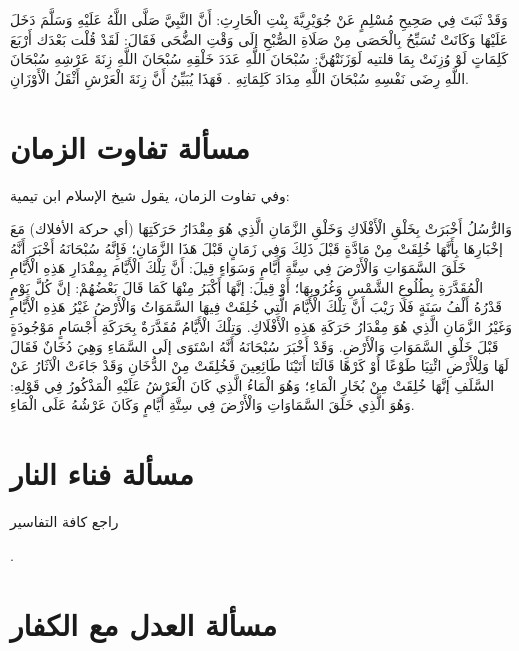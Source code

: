 وَقَدْ ثَبَتَ فِي صَحِيحِ مُسْلِمٍ {عَنْ جُوَيْرِيَّةَ بِنْتِ الْحَارِثِ: أَنَّ النَّبِيَّ صَلَّى اللَّهُ عَلَيْهِ وَسَلَّمَ دَخَلَ عَلَيْهَا وَكَانَتْ تُسَبِّحُ بِالْحَصَى مِنْ صَلَاةِ الصُّبْحِ إلَى وَقْتِ الضُّحَى فَقَالَ: لَقَدْ قُلْت بَعْدَك أَرْبَعَ كَلِمَاتٍ لَوْ وُزِنَتْ بِمَا قلتيه لَوَزَنَتْهُنَّ: سُبْحَانَ اللَّهِ عَدَدَ خَلْقِهِ سُبْحَانَ اللَّهِ زِنَةَ عَرْشِهِ سُبْحَانَ اللَّهِ رِضَى نَفْسِهِ سُبْحَانَ اللَّهِ مِدَادَ كَلِمَاتِهِ} . فَهَذَا يُبَيِّنُ أَنَّ زِنَةَ الْعَرْشِ أَثْقَلُ الْأَوْزَانِ.

\section{مسألة تفاوت الزمان}


وفي تفاوت الزمان، يقول شيخ الإسلام ابن تيمية:

وَالرُّسُلُ أَخْبَرَتْ بِخَلْقِ الْأَفْلَاكِ وَخَلْقِ الزَّمَانِ الَّذِي هُوَ مِقْدَارُ حَرَكَتِهَا (أي حركة الأفلاك) مَعَ إخْبَارِهَا بِأَنَّهَا خُلِقَتْ مِنْ مَادَّةٍ قَبْلَ ذَلِكَ وَفِي زَمَانٍ قَبْلَ هَذَا الزَّمَانِ؛ فَإِنَّهُ سُبْحَانَهُ أَخْبَرَ أَنَّهُ خَلَقَ السَّمَوَاتِ وَالْأَرْضَ فِي سِتَّةِ أَيَّامٍ وَسَوَاءٍ قِيلَ: أَنَّ تِلْكَ الْأَيَّامَ بِمِقْدَارِ هَذِهِ الْأَيَّامِ الْمُقَدَّرَةِ بِطُلُوعِ الشَّمْسِ وَغُرُوبِهَا؛ أَوْ قِيلَ: إنَّهَا أَكْبَرُ مِنْهَا كَمَا قَالَ بَعْضُهُمْ: إنَّ كُلَّ يَوْمٍ قَدْرُهُ أَلْفُ سَنَةٍ فَلَا رَيْبَ أَنَّ تِلْكَ الْأَيَّامَ الَّتِي خُلِقَتْ فِيهَا السَّمَوَاتُ وَالْأَرْضُ غَيْرُ هَذِهِ الْأَيَّامِ وَغَيْرُ الزَّمَانِ الَّذِي هُوَ مِقْدَارُ حَرَكَةِ هَذِهِ الْأَفْلَاكِ. وَتِلْكَ الْأَيَّامُ مُقَدَّرَةٌ بِحَرَكَةِ أَجْسَامٍ مَوْجُودَةٍ قَبْلَ خَلْقِ السَّمَوَاتِ وَالْأَرْضِ. وَقَدْ أَخْبَرَ سُبْحَانَهُ أَنَّهُ {اسْتَوَى إلَى السَّمَاءِ وَهِيَ دُخَانٌ فَقَالَ لَهَا وَلِلْأَرْضِ ائْتِيَا طَوْعًا أَوْ كَرْهًا قَالَتَا أَتَيْنَا طَائِعِينَ} فَخُلِقَتْ مِنْ الدُّخَانِ وَقَدْ جَاءَتْ الْآثَارُ عَنْ السَّلَفِ إنَّهَا خُلِقَتْ مِنْ بُخَارِ الْمَاءِ؛ وَهُوَ الْمَاءُ الَّذِي كَانَ الْعَرْشُ عَلَيْهِ الْمَذْكُورُ فِي قَوْلِهِ: {وَهُوَ الَّذِي خَلَقَ السَّمَاوَاتِ وَالْأَرْضَ فِي سِتَّةِ أَيَّامٍ وَكَانَ عَرْشُهُ عَلَى الْمَاءِ}.

\section{مسألة فناء النار}

راجع كافة التفاسير

\quranayah*[11][106-108]{\footnotesize \surahname*[11]}.


\section{مسألة العدل مع الكفار}
\label{sec:app_justice}

